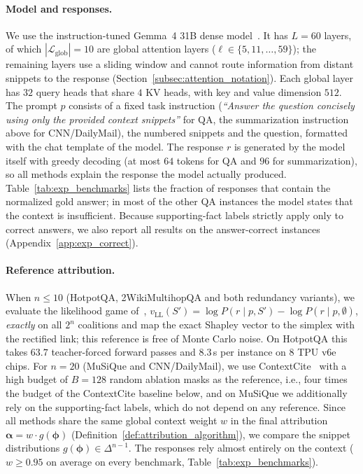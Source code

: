 \paragraph{Model and responses.}
We use the instruction-tuned Gemma~4 31B dense model~\cite{gemma4}. It has $L = 60$ layers, of which $|\mathcal{L}_{\text{glob}}| = 10$ are global attention layers ($\ell \in \{5, 11, \dots, 59\}$); the remaining layers use a sliding window and cannot route information from distant snippets to the response (Section~\ref{subsec:attention_notation}). Each global layer has $32$ query heads that share $4$ KV heads, with key and value dimension $512$. The prompt $p$ consists of a fixed task instruction (\emph{``Answer the question concisely using only the provided context snippets''} for QA, the summarization instruction above for CNN/DailyMail), the numbered snippets and the question, formatted with the chat template of the model. The response $r$ is generated by the model itself with greedy decoding (at most $64$ tokens for QA and $96$ for summarization), so all methods explain the response the model actually produced. Table~\ref{tab:exp_benchmarks} lists the fraction of responses that contain the normalized gold answer; in most of the other QA instances the model states that the context is insufficient. Because supporting-fact labels strictly apply only to correct answers, we also report all results on the answer-correct instances (Appendix~\ref{app:exp_correct}).

\paragraph{Reference attribution.}
When $n \le 10$ (HotpotQA, 2WikiMultihopQA and both redundancy variants), we evaluate the likelihood game of~\cite{nematov2025source}, $v_{\text{LL}}(S') = \log P(r \mid p, S') - \log P(r \mid p, \emptyset)$, \emph{exactly} on all $2^n$ coalitions and map the exact Shapley vector to the simplex with the rectified link; this reference is free of Monte Carlo noise. On HotpotQA this takes $63.7$ teacher-forced forward passes and $8.3$\,s per instance on $8$ TPU v6e chips. For $n = 20$ (MuSiQue and CNN/DailyMail), we use ContextCite~\cite{cohen2024contextcite} with a high budget of $B = 128$ random ablation masks as the reference, i.e., four times the budget of the ContextCite baseline below, and on MuSiQue we additionally rely on the supporting-fact labels, which do not depend on any reference. Since all methods share the same global context weight $w$ in the final attribution $\boldsymbol{\alpha} = w \cdot g(\boldsymbol{\phi})$ (Definition~\ref{def:attribution_algorithm}), we compare the snippet distributions $g(\boldsymbol{\phi}) \in \Delta^{n-1}$. The responses rely almost entirely on the context ($w \ge 0.95$ on average on every benchmark, Table~\ref{tab:exp_benchmarks}).

